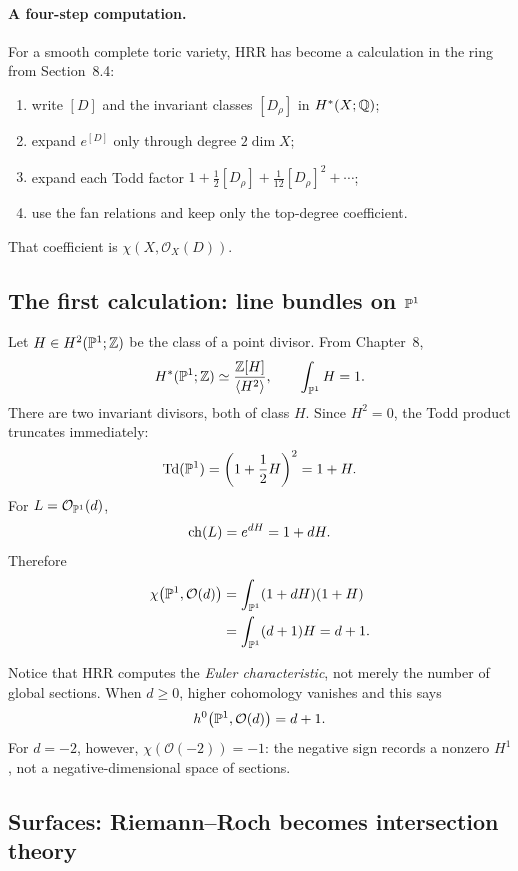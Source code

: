 \paragraph{A four-step computation.}
For a smooth complete toric variety, HRR has become a calculation in
the ring from Section~8.4:
\begin{enumerate}[label=\arabic*.,wide=0pt]
\item write \([D]\) and the invariant classes \([D_\rho]\) in
      \(H^*(X;\mathbb{Q})\);
\item expand \(e^{[D]}\) only through degree \(2\dim X\);
\item expand each Todd factor
      \(1+\frac12[D_\rho]+\frac1{12}[D_\rho]^2+\cdots\);
\item use the fan relations and keep only the top-degree coefficient.
\end{enumerate}
That coefficient is \(\chi(X,\mathcal O_X(D))\).

\subsection{The first calculation: line bundles on
\texorpdfstring{\(\mathbb{P}^1\)}{P1}}

Let \(H\in H^2(\mathbb{P}^1;\mathbb{Z})\) be the class of a point divisor. From
Chapter~8,
\[
H^*(\mathbb{P}^1;\mathbb{Z})
\simeq
\frac{\mathbb{Z}[H]}{\langle H^2\rangle},
\qquad
\int_{\mathbb{P}^1}H=1.
\]
There are two invariant divisors, both of class \(H\). Since
\(H^2=0\), the Todd product truncates immediately:
\[
\operatorname{Td}(\mathbb{P}^1)
=
\left(1+\frac12H\right)^2
=
1+H.
\]
For \(L=\mathcal O_{\mathbb{P}^1}(d)\),
\[
\operatorname{ch}(L)=e^{dH}=1+dH.
\]
Therefore
\[
\begin{aligned}
\chi\bigl(\mathbb{P}^1,\mathcal O(d)\bigr)
&=
\int_{\mathbb{P}^1}(1+dH)(1+H)\\
&=
\int_{\mathbb{P}^1}(d+1)H
=d+1.
\end{aligned}
\]

Notice that HRR computes the \emph{Euler characteristic}, not merely
the number of global sections. When \(d\ge0\), higher cohomology
vanishes and this says
\[
h^0\bigl(\mathbb{P}^1,\mathcal O(d)\bigr)=d+1.
\]
For \(d=-2\), however,
\(\chi(\mathcal O(-2))=-1\): the negative sign records a nonzero
\(H^1\), not a negative-dimensional space of sections.

\subsection{Surfaces: Riemann--Roch becomes intersection theory}

